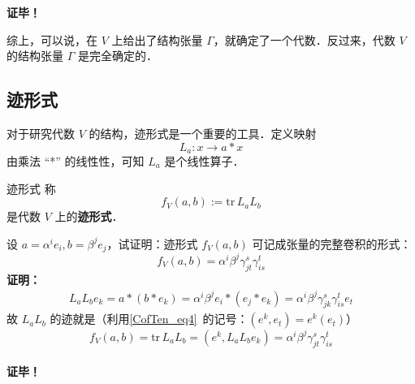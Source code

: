 \textbf{证毕！}

综上，可以说，在 $V$ 上给出了结构张量 $\Gamma$，就确定了一个代数．反过来，代数 $V$ 的结构张量 $\Gamma$ 是完全确定的．
\subsection{迹形式}

对于研究代数 $V$ 的结构，迹形式是一个重要的工具．定义映射
\begin{equation}
L_a:x\rightarrow a*x
\end{equation}
由乘法 “*” 的线性性，可知 $L_a$ 是个线性算子．
\begin{definition}{迹形式}
称
\begin{equation}
f_V(a,b):=\mathrm{tr}\, L_aL_b
\end{equation}
是代数 $V$ 上的\textbf{迹形式}．
\end{definition}
\begin{example}{}
设 $a=\alpha^i e_i,b=\beta^j e_j$，试证明：迹形式 $f_V(a,b)$ 可记成张量的完整卷积的形式：
\begin{equation}
f_V(a,b)=\alpha^i\beta^j\gamma_{jt}^s\gamma_{is}^t
\end{equation}
\textbf{证明：}
\begin{equation}
\begin{aligned}
L_aL_b e_k=a*(b*e_k)=\alpha^i\beta^je_i*(e_j*e_k)=\alpha^i\beta^j\gamma_{jk}^s \gamma_{is}^t e_t
\end{aligned}
\end{equation}
故 $L_aL_b$ 的迹就是（利用\autoref{CofTen_eq4}~的记号：$(e^k,e_t)=e^k(e_t)$）
\begin{equation}
f_V(a,b)=\mathrm{tr}\, L_a L_b=(e^k,L_aL_b e_k)=\alpha^i\beta^j\gamma_{jt}^s \gamma_{is}^t
\end{equation}\\
\textbf{证毕！}
\end{example}


